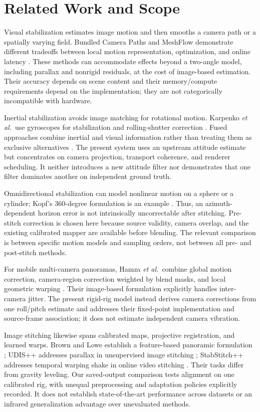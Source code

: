 \documentclass[journal]{IEEEtran}
\newcommand{\etal}{\textit{et al.}}
\begin{document}
\section{Related Work and Scope}
\label{sec:related}
Visual stabilization estimates image motion and then smooths a camera path or a spatially varying field. Bundled Camera Paths and MeshFlow demonstrate different tradeoffs between local motion representation, optimization, and online latency \cite{liu2013bundled,liu2016meshflow}. These methods can accommodate effects beyond a two-angle model, including parallax and nonrigid residuals, at the cost of image-based estimation. Their accuracy depends on scene content and their memory/compute requirements depend on the implementation; they are not categorically incompatible with hardware.

Inertial stabilization avoids image matching for rotational motion. Karpenko \etal\ use gyroscopes for stabilization and rolling-shutter correction \cite{karpenko2011gyro}. Fused approaches combine inertial and visual information rather than treating them as exclusive alternatives \cite{shi2022deepfvs}. The present system uses an upstream attitude estimate but concentrates on camera projection, transport coherence, and renderer scheduling. It neither introduces a new attitude filter nor demonstrates that one filter dominates another on independent ground truth.

Omnidirectional stabilization can model nonlinear motion on a sphere or a cylinder; Kopf's 360-degree formulation is an example \cite{kopf2016omnistab}. Thus, an azimuth-dependent horizon error is not intrinsically uncorrectable after stitching. Pre-stitch correction is chosen here because source validity, camera overlap, and the existing calibrated mapper are available before blending. The relevant comparison is between specific motion models and sampling orders, not between all pre- and post-stitch methods.

For mobile multi-camera panoramas, Hamza \etal\ combine global motion correction, camera-region correction weighted by blend masks, and local geometric warping \cite{hamza2015panovideo}. Their image-based formulation explicitly handles inter-camera jitter. The present rigid-rig model instead derives camera corrections from one roll/pitch estimate and addresses their fixed-point implementation and source-frame association; it does not estimate independent camera vibration.

Image stitching likewise spans calibrated maps, projective registration, and learned warps. Brown and Lowe establish a feature-based panoramic formulation \cite{brown2007panorama}; UDIS++ addresses parallax in unsupervised image stitching \cite{nie2023parallax}; StabStitch++ addresses temporal warping shake in online video stitching \cite{nie2025stabstitch2}. Their tasks differ from gravity leveling. Our saved-output comparison tests alignment on one calibrated rig, with unequal preprocessing and adaptation policies explicitly recorded. It does not establish state-of-the-art performance across datasets or an infrared generalization advantage over unevaluated methods.
\end{document}
